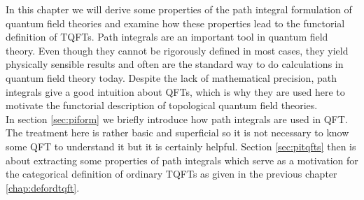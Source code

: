 In this chapter we will derive some properties of the path integral formulation of quantum field theories and examine how these properties lead to the functorial definition of TQFTs. Path integrals are an important tool in quantum field theory. Even though they cannot be rigorously defined in most cases, they yield physically sensible results and often are the standard way to do calculations in quantum field theory today. Despite the lack of mathematical precision, path integrals give a good intuition about QFTs, which is why they are used here to motivate the functorial description of topological quantum field theories.
\\
In section \ref{sec:piform} we briefly introduce how path integrals are used in QFT. The treatment here is rather basic and superficial so it is not necessary to know some QFT to understand it but it is certainly helpful. Section \ref{sec:pitqfts} then is about extracting some properties of path integrals which serve as a motivation for the categorical definition of ordinary TQFTs as given in the previous chapter \ref{chap:defordtqft}.
